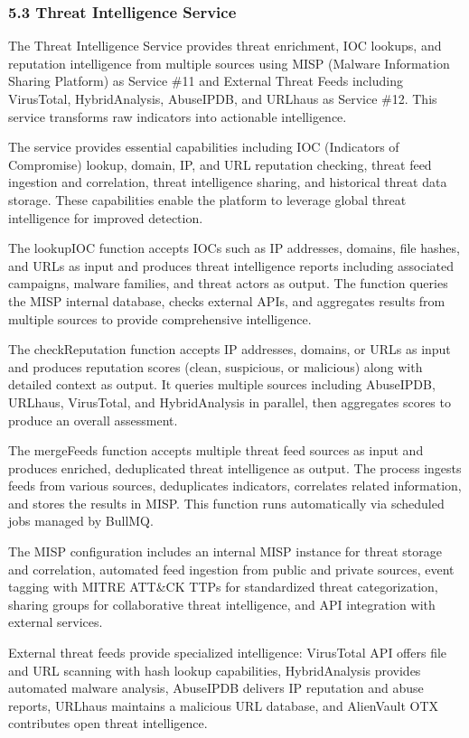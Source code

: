 \documentclass[12pt,a4paper]{report}
\begin{document}
\subsubsection{5.3 Threat Intelligence Service}

The Threat Intelligence Service provides threat enrichment, IOC lookups, and reputation intelligence from multiple sources using MISP (Malware Information Sharing Platform) as Service \#11 and External Threat Feeds including VirusTotal, HybridAnalysis, AbuseIPDB, and URLhaus as Service \#12. This service transforms raw indicators into actionable intelligence.

The service provides essential capabilities including IOC (Indicators of Compromise) lookup, domain, IP, and URL reputation checking, threat feed ingestion and correlation, threat intelligence sharing, and historical threat data storage. These capabilities enable the platform to leverage global threat intelligence for improved detection.

The lookupIOC function accepts IOCs such as IP addresses, domains, file hashes, and URLs as input and produces threat intelligence reports including associated campaigns, malware families, and threat actors as output. The function queries the MISP internal database, checks external APIs, and aggregates results from multiple sources to provide comprehensive intelligence.

The checkReputation function accepts IP addresses, domains, or URLs as input and produces reputation scores (clean, suspicious, or malicious) along with detailed context as output. It queries multiple sources including AbuseIPDB, URLhaus, VirusTotal, and HybridAnalysis in parallel, then aggregates scores to produce an overall assessment.

The mergeFeeds function accepts multiple threat feed sources as input and produces enriched, deduplicated threat intelligence as output. The process ingests feeds from various sources, deduplicates indicators, correlates related information, and stores the results in MISP. This function runs automatically via scheduled jobs managed by BullMQ.

The MISP configuration includes an internal MISP instance for threat storage and correlation, automated feed ingestion from public and private sources, event tagging with MITRE ATT\&CK TTPs for standardized threat categorization, sharing groups for collaborative threat intelligence, and API integration with external services.

External threat feeds provide specialized intelligence: VirusTotal API offers file and URL scanning with hash lookup capabilities, HybridAnalysis provides automated malware analysis, AbuseIPDB delivers IP reputation and abuse reports, URLhaus maintains a malicious URL database, and AlienVault OTX contributes open threat intelligence.
\end{document}
